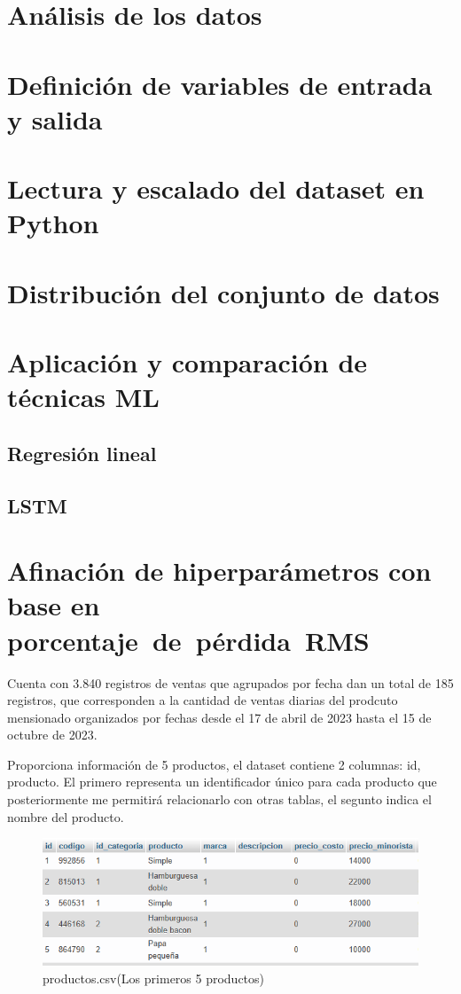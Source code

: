 \section{Análisis de los datos }
\section{Definición de variables de entrada y salida}
\section{Lectura y escalado del dataset en Python}
\section{Distribución del conjunto de datos}
\section{Aplicación y comparación de técnicas ML}
\subsection{Regresión lineal}
\subsection{LSTM}
\section{Afinación de hiperparámetros con base en porcentaje de pérdida RMS}


Cuenta con 3.840 registros de ventas que agrupados por fecha dan un total de 185 registros, que corresponden a la cantidad de ventas diarias del prodcuto mensionado organizados por fechas desde el 17 de abril de 2023 hasta el 15 de octubre de 2023.

Proporciona información de 5  productos, el dataset contiene 2 columnas: id, producto. El primero representa un identificador único para cada producto que posteriormente me permitirá relacionarlo con otras tablas, el segunto indica el nombre del producto.

\begin{figure}[H]
  \begin{center}
    \includegraphics[scale=0.90]{./tabla_producto.png}
    \caption{productos.csv(Los primeros 5 productos)}
    \label{fig:priemeros_5productos}
  \end{center}
\end{figure}


